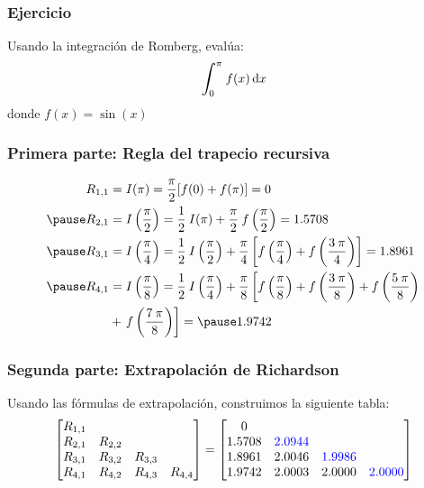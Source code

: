 \documentclass[12pt]{beamer}
\begin{document}
\begin{frame}
\frametitle{Ejercicio}
Usando la integración de Romberg, evalúa:
\begin{align*}
\scaleint{6ex}_{\bs 0}^{\pi} \: f (x) \dd{x}
\end{align*}
donde $f (x) = \sin(x)$
\end{frame}
\begin{frame}
\frametitle{Primera parte: Regla del trapecio recursiva}
\begin{eqnarray*}
\begin{aligned}
R_{1, 1} &= I(\pi) = \frac{\pi}{2} [f(0) + f(\pi)] = 0 \\ \pause
R_{2, 1} &= I \left(\frac{\pi}{2}\right) = \frac{1}{2} \: I(\pi) +  \frac{\pi}{2} \: f \left(\frac{\pi}{2} \right) = 1.5708 \\ \pause
R_{3, 1} &= I \left(\frac{\pi}{4} \right) = \frac{1}{2} \: I \left(\frac{\pi}{2} \right) + \frac{\pi}{4} \left[ f \left(\frac{\pi}{4} \right) + f \left(\frac{3 \: \pi}{4} \right) \right] = 1.8961 \\ \pause
R_{4, 1} &= I \left( \frac{\pi}{8} \right) = \frac{1}{2} \: I \left( \frac{\pi}{4} \right) + \frac{\pi}{8} \left[ f \left( \frac{\pi}{8} \right) + f \left( \frac{3 \: \pi}{8} \right) +  f \left( \frac{5 \: \pi}{8} \right) \right. \\ 
&+ \left. f \left( \frac{7 \: \pi}{8} \right) \right] = \pause 1.9742
\end{aligned}
\end{eqnarray*}

\end{frame}
\begin{frame}
\frametitle{Segunda parte: Extrapolación de Richardson}
Usando las fórmulas de extrapolación, construimos la siguiente tabla:
\pause
\begingroup %
\setlength\arraycolsep{2pt}
\begin{align*}
\begin{bmatrix}
R_{1, 1} &         &         & \\
R_{2, 1} & R_{2, 2} &         & \\
R_{3, 1} & R_{3, 2} & R_{3, 3} & \\
R_{4, 1} & R_{4, 2} & R_{4, 3} & R_{4, 4} 
\end{bmatrix}
=
\begin{bmatrix}
0      &        &        & \\
1.5708 & \color{ao}{2.0944} &        & \\
1.8961 & 2.0046 & \color{ao}{1.9986} & \\
1.9742 & 2.0003 & 2.0000 & \color{ao}{2.0000}
\end{bmatrix}
\end{align*}
\endgroup
\end{frame}
\end{document}
